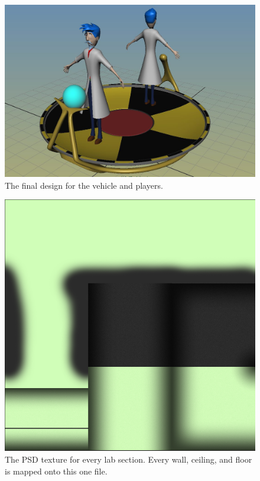 \documentclass[a4paper,oneside]{memoir}
\begin{document}
	\begin{figure}[ht]
		\begin{center}
			\includegraphics[width=150mm]{../Screenshots/Appendices/final-vehicle-design}
			\caption{The final design for the vehicle and players.}
		\end{center}
	\end{figure}

	\begin{figure}[ht]
		\begin{center}
			\includegraphics[width=130mm]{../Screenshots/Appendices/lab-texture}
			\caption{The PSD texture for every lab section. Every wall, ceiling, and floor is mapped onto this one file.}
		\end{center}
	\end{figure}
\end{document}
